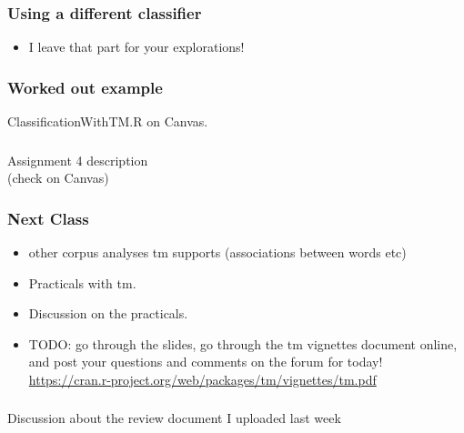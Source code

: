 \documentclass{beamer}
\begin{document}
\begin{frame}
\frametitle{Using a different classifier}
\begin{itemize}
\item I leave that part for your explorations!
\end{itemize}
\end{frame}

\begin{frame}
\frametitle{Worked out example}
ClassificationWithTM.R on Canvas.
\end{frame}

\begin{frame}
\frametitle{}
\Large Assignment 4 description
\\ \small (check on Canvas)
\end{frame}

\begin{frame}
\frametitle{Next Class}
\begin{itemize}
\item other corpus analyses tm supports (associations between words etc)
\item Practicals with tm.
\item Discussion on the practicals.
\item TODO: go through the slides, go through the tm vignettes document online, and post your questions and comments on the forum for today!
\\ \url{https://cran.r-project.org/web/packages/tm/vignettes/tm.pdf}
\end{itemize}
\end{frame}

\begin{frame}
\frametitle{}
\Large Discussion about the review document I uploaded last week
\end{frame}
\end{document}

